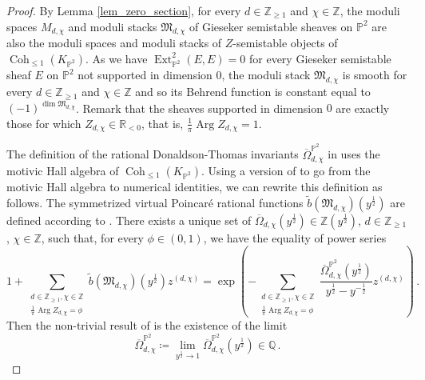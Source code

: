 \documentclass[11pt,letterpaper]{amsart}
\newcommand\PP{\mathbb P}
\newcommand\R{\mathbb R}
\newcommand\Q{\mathbb Q}
\newcommand\Z{\mathbb Z}
\newcommand\fM{\mathfrak M}
\newcommand\Arg{\operatorname{Arg}}
\newcommand\Coh{\operatorname{Coh}}
\newcommand\Ext{\operatorname{Ext}}
\begin{document}
\begin{proof}
By Lemma \ref{lem_zero_section}, for every $d \in \Z_{\geqslant 1}$ and $\chi \in \Z$, the moduli spaces $M_{d,\chi}$ and moduli stacks $\fM_{d,\chi}$ of Gieseker semistable sheaves on $\PP^2$ are also the moduli spaces and moduli stacks of $Z$-semistable objects of $\Coh_{\leqslant 1}(K_{\PP^2})$.
As we have $\Ext^2_{\PP^2}(E,E)=0$ for every Gieseker semistable sheaf $E$ on $\PP^2$ not supported in dimension $0$, 
the moduli stack $\fM_{d,\chi}$ is smooth for every $d \in \Z_{\geqslant 1}$ and $\chi \in \Z$ and so its Behrend function is constant equal to $(-1)^{\dim \fM_{d,\chi}}$. Remark that the sheaves supported
in dimension $0$ are exactly those for which $Z_{d,\chi}\in \R_{<0}$, that is, 
$\frac{1}{\pi} \Arg Z_{d,\chi}=1$.

The definition of the rational Donaldson-Thomas invariants $\overline{\Omega}_{d,\chi}^{\PP^2}$ in \cite{MR2951762} uses the motivic Hall algebra of 
$\Coh_{\leqslant 1}(K_{\PP^2})$. 
Using a version of \cite[Lemma 3.5.5]{bousseau2019scattering} 
to go from the motivic Hall algebra
to numerical identities, we can rewrite this definition as follows. 
The symmetrized virtual Poincar\'e rational functions 
$\tilde{b}(\fM_{d,\chi})(y^{\frac{1}{2}})$ are defined according to
\cite[\S 3.3]{bousseau2019scattering}.
There exists a unique set of 
$\overline{\Omega}_{d,\chi}(y^{\frac{1}{2}}) \in \Z(y^{\frac{1}{2}})$,
$d \in \Z_{\geqslant 1}$, $\chi \in \Z$, such that, for every $\phi \in (0,1)$, we have the equality of power series
\[ 1+\sum_{\substack{d \in \Z_{\geqslant 1},\chi \in \Z \\ \frac{1}{\pi} \Arg Z_{d,\chi}=\phi} } \tilde{b}(\fM_{d,\chi})(y^{\frac{1}{2}})
z^{(d,\chi)}=\exp 
\left( -\sum_{\substack{d \in \Z_{\geqslant 1},\chi \in \Z \\ 
\frac{1}{\pi} \Arg Z_{d,\chi}=\phi}} 
\frac{\overline{\Omega}^{\PP^2}_{d,\chi}(y^{\frac{1}{2}})}{y^{\frac{1}{2}}
-y^{-\frac{1}{2}}}
z^{(d,\chi)}
\right)
\,.\]
Then the non-trivial result of \cite{MR2951762} is the existence of the limit
\[ \overline{\Omega}^{\PP^2}_{d,\chi} 
\coloneq \lim_{y^{\frac{1}{2}} \rightarrow 1} \overline{\Omega}^{\PP^2}_{d,\chi}
(y^{\frac{1}{2}}) \in \Q\,.\]


\end{proof}
\end{document}
